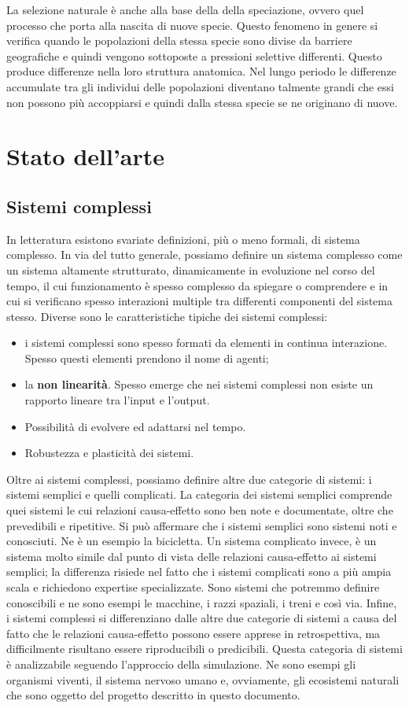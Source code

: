 \documentclass[11pt]{article}
\begin{document}
La selezione naturale è anche alla base della della speciazione, ovvero quel processo che porta alla nascita di nuove specie. Questo fenomeno in genere si verifica quando le popolazioni della stessa specie sono divise da barriere geografiche e quindi vengono sottoposte a pressioni selettive differenti. Questo produce differenze nella loro struttura anatomica. Nel lungo periodo le differenze accumulate tra gli individui delle popolazioni diventano talmente grandi che essi non possono più accoppiarsi e quindi dalla stessa specie se ne originano di nuove. 

\section{Stato dell'arte}
\subsection{Sistemi complessi}
In letteratura esistono svariate definizioni, più o meno formali, di sistema complesso. In via del tutto generale, possiamo definire un sistema complesso come un sistema altamente strutturato, dinamicamente in evoluzione nel corso del tempo, il cui funzionamento è spesso complesso da spiegare o comprendere e in cui si verificano spesso interazioni multiple tra differenti componenti del sistema stesso. Diverse sono le caratteristiche tipiche dei sistemi complessi: 
\begin{itemize}
    \item i sistemi complessi sono spesso formati da elementi in continua interazione. Spesso questi elementi prendono il nome di agenti;
    \item la \textbf{non linearità}. Spesso emerge che nei sistemi complessi non esiste un rapporto lineare tra l'input e l'output.
    \item Possibilità di evolvere ed adattarsi nel tempo. 
    \item Robustezza e plasticità dei sistemi. 
\end{itemize}
Oltre ai sistemi complessi, possiamo definire altre due categorie di sistemi: i sistemi semplici e quelli complicati. La categoria dei sistemi semplici comprende quei sistemi le cui relazioni causa-effetto sono ben note e documentate, oltre che prevedibili e ripetitive. Si può affermare che i sistemi semplici sono sistemi noti e conosciuti. Ne è un esempio la bicicletta. Un sistema complicato invece, è un sistema molto simile dal punto di vista delle relazioni causa-effetto ai sistemi semplici; la differenza risiede nel fatto che i sistemi complicati sono a più ampia scala e richiedono expertise specializzate. Sono sistemi che potremmo definire conoscibili e ne sono esempi le macchine, i razzi spaziali, i treni e così via. Infine, i sistemi complessi si differenziano dalle altre due categorie di sistemi a causa del fatto che le relazioni causa-effetto possono essere apprese in retrospettiva, ma difficilmente risultano essere riproducibili o predicibili. Questa categoria di sistemi è analizzabile seguendo l'approccio della simulazione. Ne sono esempi gli organismi viventi, il sistema nervoso umano e, ovviamente, gli ecosistemi naturali che sono oggetto del progetto descritto in questo documento. 
\end{document}
